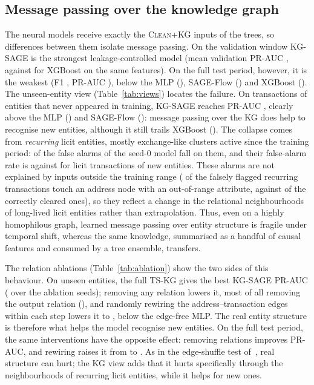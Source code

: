 \subsection{Message passing over the knowledge graph}
The neural models receive exactly the \textsc{Clean+KG} inputs of the
trees, so differences between them isolate message passing. On the
validation window KG-SAGE is the strongest leakage-controlled model (mean
validation PR-AUC \KgSageValPr{}, against \XgbCleanKgValPr{} for XGBoost on
the same features). On the full test period, however, it is the weakest
(F1 \KgSageFone{}, PR-AUC \KgSagePr{}), below the MLP (\MlpPr{}), SAGE-Flow
(\SageFlowPr{}) and XGBoost (\XgbCleanKgPr{}). The unseen-entity view
(Table~\ref{tab:views}) locates the failure. On transactions of entities
that never appeared in training, KG-SAGE reaches PR-AUC
\KgSageUnseenPr{}, clearly above the MLP (\MlpUnseenPr{}) and SAGE-Flow
(\SageFlowUnseenPr{}): message passing over the KG does help to recognise new
entities, although it still trails XGBoost (\XgbCleanKgUnseenPr{}). The
collapse comes from \emph{recurring} licit entities, mostly exchange-like
clusters active since the training period: \DiagFpRecurShare{} of the
\DiagFp{} false alarms of the seed-0 model fall on them, and their false-alarm
rate is \DiagFpRateRecur{} against \DiagFpRateUnseen{} for licit transactions of
new entities. These alarms are not explained by inputs outside the training
range (\DiagOorFp{} of the falsely flagged recurring transactions touch an
address node with an out-of-range attribute, against \DiagOorTn{} of the
correctly cleared ones), so they reflect a change in the relational
neighbourhoods of long-lived licit entities rather than extrapolation. Thus,
even on a highly homophilous graph, learned message passing over entity
structure is fragile under temporal shift, whereas the same knowledge,
summarised as a handful of causal features and consumed by a tree ensemble,
transfers.



The relation ablations (Table~\ref{tab:ablation}) show the two sides of this
behaviour. On unseen entities, the full TS-KG gives the best KG-SAGE PR-AUC
(\AblFullUnseenPr{} over the ablation seeds); removing any relation lowers it,
most of all removing the output relation (\AblNoOutUnseenPr{}), and randomly
rewiring the address--transaction edges within each step lowers it to
\AblShufUnseenPr{}, below the edge-free MLP. The real entity structure is
therefore what helps the model recognise new entities. On the full test
period, the same interventions have the opposite effect: removing relations
improves PR-AUC, and rewiring raises it from \AblFullPr{} to \AblShufPr{}. As
in the edge-shuffle test of~\cite{maganti2026}, real structure can hurt; the
KG view adds that it hurts specifically through the neighbourhoods of
recurring licit entities, while it helps for new ones.

